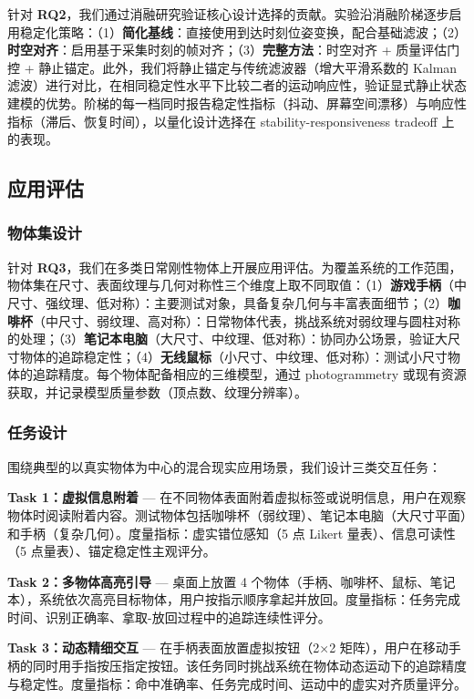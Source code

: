 \documentclass[review]{vgtc}
\begin{document}
针对 \textbf{RQ2}，我们通过消融研究验证核心设计选择的贡献。实验沿消融阶梯逐步启用稳定化策略：（1）\textbf{简化基线}：直接使用到达时刻位姿变换，配合基础滤波；（2）\textbf{时空对齐}：启用基于采集时刻的帧对齐；（3）\textbf{完整方法}：时空对齐 + 质量评估门控 + 静止锚定。此外，我们将静止锚定与传统滤波器（增大平滑系数的 Kalman 滤波）进行对比，在相同稳定性水平下比较二者的运动响应性，验证显式静止状态建模的优势。阶梯的每一档同时报告稳定性指标（抖动、屏幕空间漂移）与响应性指标（滞后、恢复时间），以量化设计选择在 stability-responsiveness tradeoff 上的表现。

\subsection{应用评估}


\subsubsection{物体集设计}


针对 \textbf{RQ3}，我们在多类日常刚性物体上开展应用评估。为覆盖系统的工作范围，物体集在尺寸、表面纹理与几何对称性三个维度上取不同取值：（1）\textbf{游戏手柄}（中尺寸、强纹理、低对称）：主要测试对象，具备复杂几何与丰富表面细节；（2）\textbf{咖啡杯}（中尺寸、弱纹理、高对称）：日常物体代表，挑战系统对弱纹理与圆柱对称的处理；（3）\textbf{笔记本电脑}（大尺寸、中纹理、低对称）：协同办公场景，验证大尺寸物体的追踪稳定性；（4）\textbf{无线鼠标}（小尺寸、中纹理、低对称）：测试小尺寸物体的追踪精度。每个物体配备相应的三维模型，通过 photogrammetry 或现有资源获取，并记录模型质量参数（顶点数、纹理分辨率）。

\subsubsection{任务设计}


围绕典型的以真实物体为中心的混合现实应用场景，我们设计三类交互任务：

\textbf{Task 1：虚拟信息附着} --- 在不同物体表面附着虚拟标签或说明信息，用户在观察物体时阅读附着内容。测试物体包括咖啡杯（弱纹理）、笔记本电脑（大尺寸平面）和手柄（复杂几何）。度量指标：虚实错位感知（5 点 Likert 量表）、信息可读性（5 点量表）、锚定稳定性主观评分。

\textbf{Task 2：多物体高亮引导} --- 桌面上放置 4 个物体（手柄、咖啡杯、鼠标、笔记本），系统依次高亮目标物体，用户按指示顺序拿起并放回。度量指标：任务完成时间、识别正确率、拿取-放回过程中的追踪连续性评分。

\textbf{Task 3：动态精细交互} --- 在手柄表面放置虚拟按钮（2×2 矩阵），用户在移动手柄的同时用手指按压指定按钮。该任务同时挑战系统在物体动态运动下的追踪精度与稳定性。度量指标：命中准确率、任务完成时间、运动中的虚实对齐质量评分。
\end{document}
